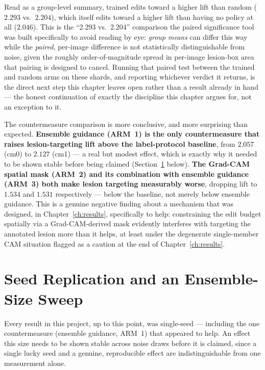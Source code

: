 Read as a group-level summary, trained edits toward a higher lift than
random ($2.293$ vs.\ $2.204$), which itself edits toward a higher lift than
having no policy at all ($2.046$). This is the ``2.293 vs.\ 2.204''
comparison the paired significance tool was built specifically to avoid
reading by eye: \emph{group means} can differ this way while the
\emph{paired}, per-image difference is not statistically distinguishable
from noise, given the roughly order-of-magnitude spread in per-image
lesion-box area that pairing is designed to cancel. Running that paired
test between the trained and random arms on these shards, and reporting
whichever verdict it returns, is the direct next step this chapter leaves
open rather than a result already in hand --- the honest continuation of
exactly the discipline this chapter argues for, not an exception to it.

The countermeasure comparison is more conclusive, and more surprising than
expected. \textbf{Ensemble guidance (ARM~1) is the only countermeasure that
raises lesion-targeting lift above the label-protocol baseline}, from
$2.057$ (cm0) to $2.127$ (cm1) --- a real but modest effect, which is
exactly why it needed to be shown stable before being claimed
(Section~\ref{sec:seeds} below). \textbf{The Grad-CAM spatial mask (ARM~2)
and its combination with ensemble guidance (ARM~3) both make lesion
targeting measurably worse}, dropping lift to $1.534$ and $1.531$
respectively --- below the baseline, not merely below ensemble guidance.
This is a genuine negative finding about a mechanism that was designed, in
Chapter~\ref{ch:results}, specifically to help: constraining the edit
budget spatially via a Grad-CAM-derived mask evidently interferes with
targeting the annotated lesion more than it helps, at least under the
degenerate single-member CAM situation flagged as a caution at the end of
Chapter~\ref{ch:results}.

\section{Seed Replication and an Ensemble-Size Sweep}
\label{sec:seeds}

Every result in this project, up to this point, was single-seed --- including
the one countermeasure (ensemble guidance, ARM~1) that appeared to help.
An effect this size needs to be shown stable across noise draws before it
is claimed, since a single lucky seed and a genuine, reproducible effect
are indistinguishable from one measurement alone.

